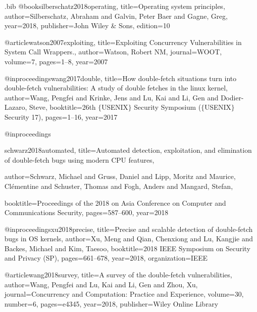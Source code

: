 \usepackage{filecontents}

\usepackage{listings}
\usepackage{parcolumns}
\usepackage{graphicx}
\usepackage{caption}
\usepackage{subcaption}
\usepackage{cleveref}

\begin{filecontents}{\jobname.bib}
@book{silberschatz2018operating,
  title={Operating system principles},
  author={Silberschatz, Abraham and Galvin, Peter Baer and Gagne, Greg},
  year={2018},
  publisher={John Wiley \& Sons},
  edition={10}
}

@article{watson2007exploiting,
  title={Exploiting Concurrency Vulnerabilities in System Call Wrappers.},
  author={Watson, Robert NM},
  journal={WOOT},
  volume={7},
  pages={1--8},
  year={2007}
}

@inproceedings{wang2017double,
  title={How double-fetch situations turn into double-fetch vulnerabilities: A 
  study of double fetches in the linux kernel},
  author={Wang, Pengfei and Krinke, Jens and Lu, Kai and Li, Gen and 
  Dodier-Lazaro, Steve},
  booktitle={26th $\{$USENIX$\}$ Security Symposium 
  ($\{$USENIX$\}$ Security 17)},
  pages={1--16},
  year={2017}
}

@inproceedings{schwarz2018automated,
  title={Automated detection, exploitation, and elimination of double-fetch bugs
   using modern CPU features},

  author={Schwarz, Michael and Gruss, Daniel and Lipp, Moritz and Maurice,
  Cl{\'e}mentine and Schuster, Thomas and Fogh, Anders and Mangard, Stefan},

  booktitle={Proceedings of the 2018 on Asia Conference on Computer and Communications Security},
  pages={587--600},
  year={2018}
}

@inproceedings{xu2018precise,
  title={Precise and scalable detection of double-fetch bugs in OS kernels},
  author={Xu, Meng and Qian, Chenxiong and Lu, Kangjie and Backes, Michael
   and Kim, Taesoo},
  booktitle={2018 IEEE Symposium on Security and Privacy (SP)},
  pages={661--678},
  year={2018},
  organization={IEEE}
}

@article{wang2018survey,
  title={A survey of the double-fetch vulnerabilities},
  author={Wang, Pengfei and Lu, Kai and Li, Gen and Zhou, Xu},
  journal={Concurrency and Computation: Practice and Experience},
  volume={30},
  number={6},
  pages={e4345},
  year={2018},
  publisher={Wiley Online Library}
}


\end{filecontents}
